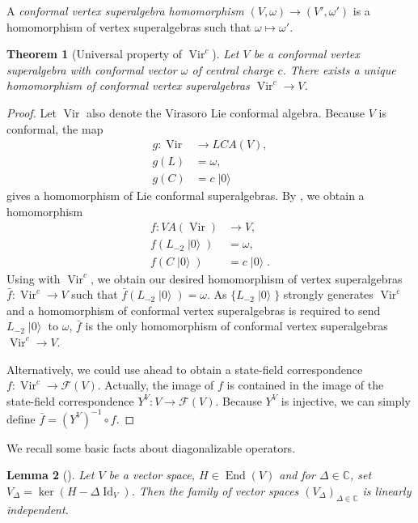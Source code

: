 \documentclass[a4paper, 12pt, reqno]{amsart}
\newtheorem{theorem}{Theorem}[section]
\newtheorem{lemma}[theorem]{Lemma}
\theoremstyle{remark}
\numberwithin{equation}{subsection}
\DeclareMathOperator{\Vir}{Vir}
\DeclareMathOperator{\Id}{Id}
\DeclareMathOperator{\End}{End}
\DeclareMathOperator{\vac}{|0\rangle}
\begin{document}
A \emph{conformal vertex superalgebra homomorphism} $(V, \omega) \to (V', \omega')$ is a homomorphism of vertex superalgebras such that $\omega \mapsto \omega'$.

\begin{theorem}[Universal property of $\Vir^c$]
  \label{thr:22}
  Let $V$ be a conformal vertex superalgebra with conformal vector $\omega$ of central charge $c$.
  There exists a unique homomorphism of conformal vertex superalgebras $\Vir^c \to V$.
\end{theorem}

\begin{proof}
  Let $\Vir$ also denote the Virasoro Lie conformal algebra.
  Because $V$ is conformal, the map
  \begin{align*}
    g: \Vir &\to LCA(V), \\
    g(L) &= \omega, \\
    g(C) &= c\vac
  \end{align*}
  gives a homomorphism of Lie conformal superalgebras.
  By , we obtain a homomorphism
  \begin{align*}
    f: VA(\Vir) &\to V, \\
    f(L_{-2}\vac) &= \omega, \\
    f(C\vac) &= c\vac.
  \end{align*}
  Using  with $\Vir^c$, we obtain our desired homomorphism of vertex superalgebras $\bar{f}: \Vir^c \to V$ such that $\bar{f}(L_{-2}\vac) = \omega$.
  As $\{L_{-2}\vac\}$ strongly generates $\Vir^c$ and a homomorphism of conformal vertex superalgebras is required to send $L_{-2}\vac$ to $\omega$, $\bar{f}$ is the only homomorphism of conformal vertex superalgebras $\Vir^c \to V$.

  Alternatively, we could use  ahead to obtain a state-field correspondence $f: \Vir^c \to \mathcal{F}(V)$.
  Actually, the image of $f$ is contained in the image of the state-field correspondence $Y^V: V \to \mathcal{F}(V)$.
  Because $Y^V$ is injective, we can simply define $\bar{f} = (Y^V)^{-1}\circ f$.
\end{proof}

We recall some basic facts about diagonalizable operators.

\begin{lemma}[{\cite[\S6.2]{hoffman_linear_1971}}]
  \label{lmm:8}
  Let $V$ be a vector space, $H \in \End(V)$ and for $\Delta \in \mathbb{C}$, set $V_{\Delta} = \ker(H - \Delta\Id_V)$.
  Then the family of vector spaces $(V_{\Delta})_{\Delta \in \mathbb{C}}$ is linearly independent.
\end{lemma}
\end{document}
